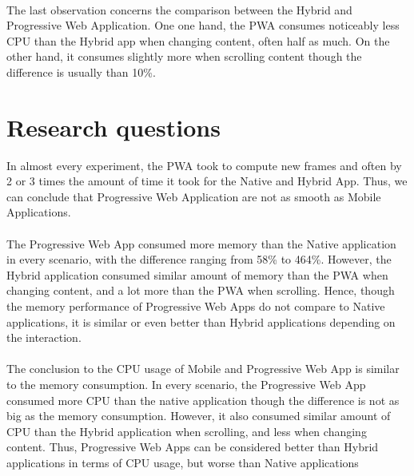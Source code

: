 \documentclass{kththesis}
\begin{document}
\paragraph{}
The last observation concerns the comparison between the Hybrid and Progressive Web Application. One one hand, the PWA consumes noticeably less CPU than the Hybrid app when changing content, often half as much. On the other hand, it consumes slightly more when scrolling content though the difference is usually than 10\%. 

\section{Research questions}
In almost every experiment, the PWA took to compute new frames and often by 2 or 3 times the amount of time it took for the Native and Hybrid App. Thus, we can conclude that Progressive Web Application are not as smooth as Mobile Applications.

\paragraph{}
The Progressive Web App consumed more memory than the Native application in every scenario, with the difference ranging from 58\% to 464\%. However, the Hybrid application consumed similar amount of memory than the PWA when changing content, and a lot more than the PWA when scrolling. Hence, though the memory performance of Progressive Web Apps do not compare to Native applications, it is similar or even better than Hybrid applications depending on the interaction.

\paragraph{}
The conclusion to the CPU usage of Mobile and Progressive Web App is similar to the memory consumption. In every scenario, the Progressive Web App consumed more CPU than the native application though the difference is not as big as the memory consumption. However, it also consumed similar amount of CPU than the Hybrid application when scrolling, and less when changing content. Thus, Progressive Web Apps can be considered better than Hybrid applications in terms of CPU usage, but worse than Native applications 
\end{document}

